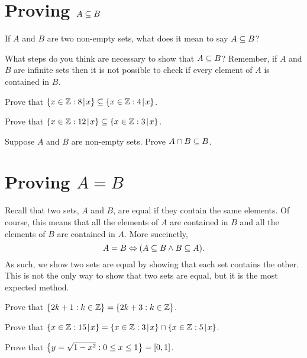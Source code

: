 \section{Proving $A \subseteq B$}

\begin{question}[resume]
\item If $A$ and $B$ are two non-empty sets, what does it mean to say $A \subseteq B$?  

\vspace{1in}

\item What steps do you think are necessary to show that $A \subseteq B$?  Remember, if $A$ and $B$ are infinite sets then it is not possible to check if every element of $A$ is contained in $B$.

\vspace{3in}

\item Prove that $\left\{x \in \mathbb{Z} : 8 \! \mid \! x\right\} \subseteq \left\{x \in \mathbb{Z} : 4 \! \mid \! x\right\}$.

\vspace{4in}

\item Prove that $\left\{x \in \mathbb{Z} : 12 \! \mid \! x\right\} \subseteq \left\{x \in \mathbb{Z} : 3 \! \mid \! x\right\}$.

\vspace{3in}
\newpage
\item Suppose $A$ and $B$ are non-empty sets.  Prove $A \cap B \subseteq B$.

\vspace{2in}
\end{question}

\section{Proving $A = B$}
Recall that two sets, $A$ and $B$, are equal if they contain the same elements.  Of course, this means that all the elements of $A$ are contained in $B$ and all the elements of $B$ are contained in $A$.  More succinctly,
\[A = B \Leftrightarrow (A \subseteq B \wedge B \subseteq A).\]
As such, we show two sets are equal by showing that each set contains the other.  This is not the only way to show that two sets are equal, but it is the most expected method.

\begin{question}[resume]
\item Prove that $\left\{2k+1: k \in \mathbb{Z}\right\} = \left\{2k+3 : k \in \mathbb{Z}\right\}$.

\newpage

\item Prove that $\left\{x \in \mathbb{Z}: 15 \! \mid \! x\right\} = \left\{x \in \mathbb{Z}: 3 \! \mid \! x\right\} \cap \left\{x \in \mathbb{Z}: 5 \! \mid \! x\right\}$.

\newpage

\item Prove that $\left\{y=\sqrt{1-x^2}: 0 \leq x \leq 1\right\} = [0,1]$.

\newpage


\end{question}

